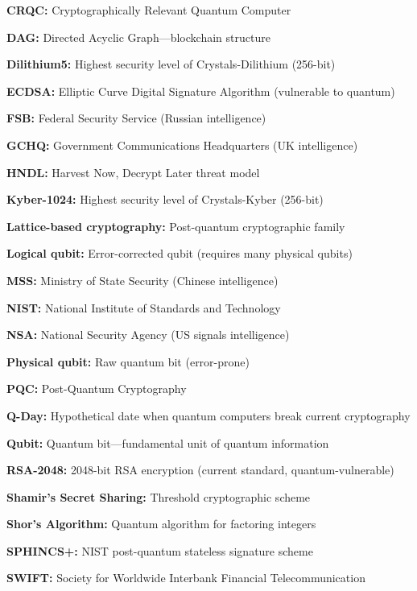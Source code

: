 \documentclass[12pt,oneside]{book}
\begin{document}
\textbf{CRQC:} Cryptographically Relevant Quantum Computer

\textbf{DAG:} Directed Acyclic Graph—blockchain structure

\textbf{Dilithium5:} Highest security level of Crystals-Dilithium (256-bit)

\textbf{ECDSA:} Elliptic Curve Digital Signature Algorithm (vulnerable to quantum)

\textbf{FSB:} Federal Security Service (Russian intelligence)

\textbf{GCHQ:} Government Communications Headquarters (UK intelligence)

\textbf{HNDL:} Harvest Now, Decrypt Later threat model

\textbf{Kyber-1024:} Highest security level of Crystals-Kyber (256-bit)

\textbf{Lattice-based cryptography:} Post-quantum cryptographic family

\textbf{Logical qubit:} Error-corrected qubit (requires many physical qubits)

\textbf{MSS:} Ministry of State Security (Chinese intelligence)

\textbf{NIST:} National Institute of Standards and Technology

\textbf{NSA:} National Security Agency (US signals intelligence)

\textbf{Physical qubit:} Raw quantum bit (error-prone)

\textbf{PQC:} Post-Quantum Cryptography

\textbf{Q-Day:} Hypothetical date when quantum computers break current cryptography

\textbf{Qubit:} Quantum bit—fundamental unit of quantum information

\textbf{RSA-2048:} 2048-bit RSA encryption (current standard, quantum-vulnerable)

\textbf{Shamir's Secret Sharing:} Threshold cryptographic scheme

\textbf{Shor's Algorithm:} Quantum algorithm for factoring integers

\textbf{SPHINCS+:} NIST post-quantum stateless signature scheme

\textbf{SWIFT:} Society for Worldwide Interbank Financial Telecommunication
\end{document}
